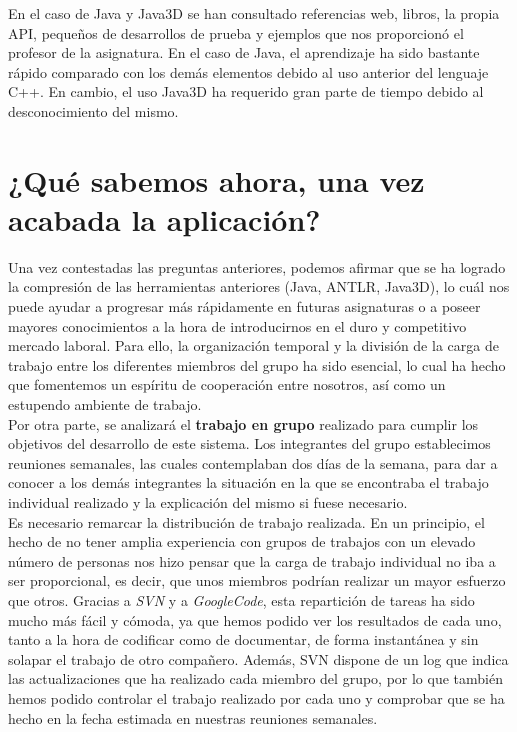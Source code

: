    En el caso de Java y Java3D se han consultado referencias web, libros, la propia API, pequeños de desarrollos de prueba y ejemplos que
   nos proporcionó el profesor de la asignatura. En el caso de Java, el aprendizaje ha sido bastante rápido comparado con los demás elementos
   debido al uso anterior del lenguaje C++. En cambio, el uso Java3D ha requerido gran parte de tiempo debido al desconocimiento del mismo. 


   \section{¿Qué sabemos ahora, una vez acabada la aplicación?}
   Una vez contestadas las preguntas anteriores, podemos afirmar que se ha logrado la compresión de las herramientas anteriores (Java, 
   ANTLR, Java3D), lo cuál nos puede ayudar a progresar más rápidamente en futuras asignaturas o a poseer mayores conocimientos a la hora 
   de introducirnos en el duro y competitivo mercado laboral. Para ello, la organización temporal y la división de la carga de trabajo entre
   los diferentes miembros del grupo ha sido esencial, lo cual ha hecho que fomentemos un espíritu de cooperación entre nosotros, así como un
   estupendo ambiente de trabajo.\\[1.5cm]

   Por otra parte, se analizará el \textbf{trabajo en grupo} realizado para cumplir los objetivos del desarrollo de este sistema. Los integrantes
   del grupo establecimos reuniones semanales, las cuales contemplaban dos días de la semana, para dar a conocer a los demás integrantes
   la situación en la que se encontraba el trabajo individual realizado y la explicación del mismo si fuese necesario.\\

   Es necesario remarcar la distribución de trabajo realizada. En un principio, el hecho de no tener amplia experiencia con grupos de 
   trabajos con un elevado número de personas nos hizo pensar que la carga de trabajo individual no iba a ser proporcional, es decir,
   que unos miembros podrían realizar un mayor esfuerzo que otros. Gracias a \textit{SVN} y a \textit{GoogleCode}, esta repartición de tareas ha sido
   mucho más fácil y cómoda, ya que hemos podido ver los resultados de cada uno, tanto a la hora de codificar como de documentar, de forma 
   instantánea y sin solapar el trabajo de otro compañero. Además, SVN dispone de un log que indica las actualizaciones que ha realizado
   cada miembro del grupo, por lo que también hemos podido controlar el trabajo realizado por cada uno y comprobar que se ha hecho en la 
   fecha estimada en nuestras reuniones semanales.\\

